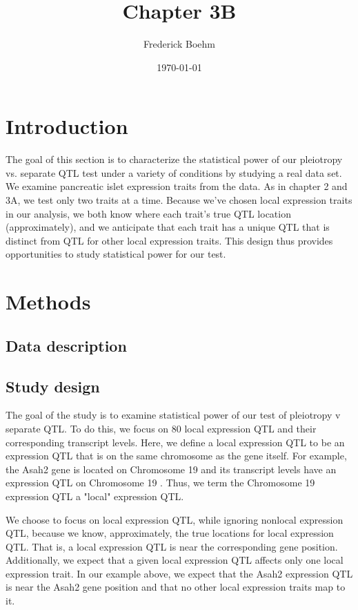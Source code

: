 \documentclass{article}
\title{Chapter 3B}
\author{Frederick Boehm}
\date{\today}
\begin{document}
\doublespacing
\maketitle
\listoftodos
\tableofcontents
\listoffigures
\listoftables



\section{Introduction}



The goal of this section is to characterize the statistical power of our pleiotropy vs. separate QTL test under a variety of conditions by studying a real data set. We examine pancreatic islet expression traits from the \citet{keller2018genetic} data. As in chapter 2 and 3A, we test only two traits at a time. Because we’ve chosen local expression traits in our analysis, we both know where each trait’s true QTL location (approximately), and we anticipate that each trait has a unique QTL that is distinct from QTL for other local expression traits. This design thus provides opportunities to study statistical power for our test.


\section{Methods}

\subsection{Data description}




\subsection{Study design}
The goal of the study is to examine statistical power of our test of pleiotropy v separate QTL. To do this, we focus on 80 local expression QTL and their corresponding transcript levels. Here, we define a local expression QTL to be an expression QTL that is on the same chromosome as the gene itself. For example, the Asah2 gene is located on Chromosome 19 and its transcript levels have an expression QTL on Chromosome 19 . Thus, we term the Chromosome 19 expression QTL a "local" expression QTL. 

We choose to focus on local expression QTL, while ignoring nonlocal expression QTL, because we know, approximately, the true locations for local expression QTL. That is, a local expression QTL is near the corresponding gene position. Additionally, we expect that a given local expression QTL affects only one local expression trait. In our example above, we expect that the Asah2 expression QTL is near the Asah2 gene position and that no other local expression traits map to it.
\end{document}
